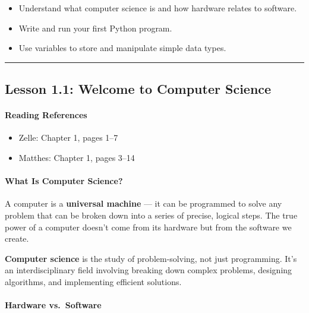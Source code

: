 \documentclass[
  justified,
  openright,
]{tufte-book}
\let\subsubsection\paragraph
\let\paragraph\paragraph
\let\subsubsection\paragraph
\let\paragraph\paragraph
\providecommand{\tightlist}{%
  \setlength{\itemsep}{0pt}\setlength{\parskip}{0pt}}
\begin{document}
\begin{itemize}
\tightlist
\item
  Understand what computer science is and how hardware relates to
  software.
\item
  Write and run your first Python program.
\item
  Use variables to store and manipulate simple data types.
\end{itemize}

\begin{center}\rule{0.5\linewidth}{0.5pt}\end{center}

\subsection{Lesson 1.1: Welcome to Computer
Science}\label{lesson-1.1-welcome-to-computer-science-1}

\subsubsection{Reading References}\label{reading-references-4}

\begin{itemize}
\tightlist
\item
  Zelle: Chapter 1, pages 1--7
\item
  Matthes: Chapter 1, pages 3--14
\end{itemize}

\subsubsection{What Is Computer
Science?}\label{what-is-computer-science}

A computer is a \textbf{universal machine} --- it can be programmed to
solve any problem that can be broken down into a series of precise,
logical steps. The true power of a computer doesn't come from its
hardware but from the software we create.

\textbf{Computer science} is the study of problem-solving, not just
programming. It's an interdisciplinary field involving breaking down
complex problems, designing algorithms, and implementing efficient
solutions.

\subsubsection{Hardware vs.~Software}\label{hardware-vs.-software}
\end{document}
